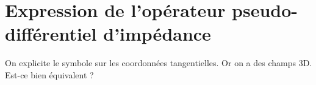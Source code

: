 \chapter{Expression de l'opérateur pseudo-différentiel d'impédance}
\minitoc
\begin{TODO}
    On explicite le symbole sur les coordonnées tangentielles. Or on a des champs 3D. Est-ce bien équivalent ?
\end{TODO}



